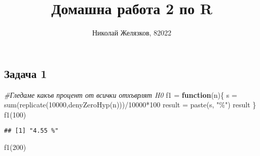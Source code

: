 \documentclass[
]{article}
\title{Домашна работа 2 по R}
\author{Николай Желязков, 82022}
\date{}
\newenvironment{Shaded}{\begin{snugshade}}{\end{snugshade}}
\newcommand{\AttributeTok}[1]{\textcolor[rgb]{0.77,0.63,0.00}{#1}}
\newcommand{\CommentTok}[1]{\textcolor[rgb]{0.56,0.35,0.01}{\textit{#1}}}
\newcommand{\ControlFlowTok}[1]{\textcolor[rgb]{0.13,0.29,0.53}{\textbf{#1}}}
\newcommand{\DecValTok}[1]{\textcolor[rgb]{0.00,0.00,0.81}{#1}}
\newcommand{\FloatTok}[1]{\textcolor[rgb]{0.00,0.00,0.81}{#1}}
\newcommand{\FunctionTok}[1]{\textcolor[rgb]{0.00,0.00,0.00}{#1}}
\newcommand{\NormalTok}[1]{#1}
\newcommand{\OtherTok}[1]{\textcolor[rgb]{0.56,0.35,0.01}{#1}}
\newcommand{\SpecialCharTok}[1]{\textcolor[rgb]{0.00,0.00,0.00}{#1}}
\newcommand{\StringTok}[1]{\textcolor[rgb]{0.31,0.60,0.02}{#1}}
\begin{document}
\maketitle

\hypertarget{ux437ux430ux434ux430ux447ux430-1}{%
\subsection{\texorpdfstring{\textbf{Задача
1}}{Задача 1}}\label{ux437ux430ux434ux430ux447ux430-1}}

\begin{Shaded}
\end{Shaded}

\begin{Shaded}
\begin{Highlighting}[]
\CommentTok{\#Гледаме какъв процент от всички отхъврлят H0}
\NormalTok{f1 }\OtherTok{=} \ControlFlowTok{function}\NormalTok{(n)\{}
\NormalTok{  s }\OtherTok{=} \FunctionTok{sum}\NormalTok{(}\FunctionTok{replicate}\NormalTok{(}\DecValTok{10000}\NormalTok{,}\FunctionTok{denyZeroHyp}\NormalTok{(n)))}\SpecialCharTok{/}\DecValTok{10000}\SpecialCharTok{*}\DecValTok{100}
\NormalTok{  result }\OtherTok{=} \FunctionTok{paste}\NormalTok{(s, }\StringTok{"\%"}\NormalTok{)}
\NormalTok{  result}
\NormalTok{\}}
\FunctionTok{f1}\NormalTok{(}\DecValTok{100}\NormalTok{)}
\end{Highlighting}
\end{Shaded}

\begin{verbatim}
## [1] "4.55 %"
\end{verbatim}

\begin{Shaded}
\begin{Highlighting}[]
\FunctionTok{f1}\NormalTok{(}\DecValTok{200}\NormalTok{)}
\end{Highlighting}
\end{Shaded}
\end{document}

